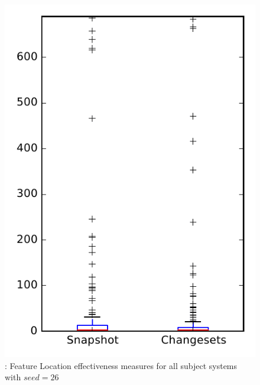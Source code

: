 
\begin{figure}
\centering
\includegraphics[height=0.4\textheight]{figures/flt_seed/rq1_overview_26}
\caption{\rone: Feature Location effectiveness measures for all subject systems with $seed=26$}
\label{fig:flt_seed:rq1:overview}
\end{figure}
